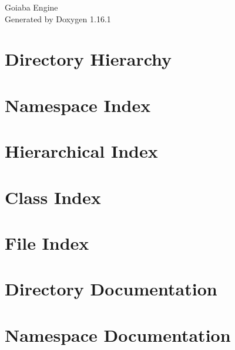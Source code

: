 \documentclass[twoside]{book}
\newcommand{\+}{\discretionary{\mbox{\scriptsize$\hookleftarrow$}}{}{}}
\newcommand{\clearemptydoublepage}{%
    \newpage{\pagestyle{empty}\cleardoublepage}%
  }
\begin{document}
  \raggedbottom
    \hypersetup{pageanchor=false,
                bookmarksnumbered=true,
                pdfencoding=unicode
               }
  \begin{titlepage}
  \vspace*{7cm}
  \begin{center}%
  {\Large Goiaba Engine}\\
  \vspace*{1cm}
  {\large Generated by Doxygen 1.16.1}\\
  \end{center}
  \end{titlepage}
  \clearemptydoublepage
  \tableofcontents
  \clearemptydoublepage
  \hypersetup{pageanchor=true}
\chapter{Directory Hierarchy}

\chapter{Namespace Index}

\chapter{Hierarchical Index}

\chapter{Class Index}

\chapter{File Index}

\chapter{Directory Documentation}





\chapter{Namespace Documentation}




\end{document}
